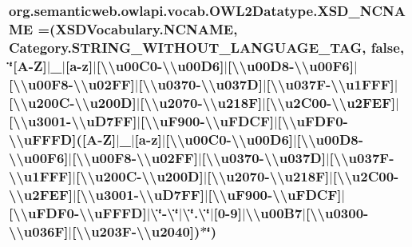 {\subsubsection[{X\-S\-D\-\_\-\-N\-C\-N\-A\-M\-E}]{\setlength{\rightskip}{0pt plus 5cm}org.\-semanticweb.\-owlapi.\-vocab.\-O\-W\-L2\-Datatype.\-X\-S\-D\-\_\-\-N\-C\-N\-A\-M\-E =({\bf X\-S\-D\-Vocabulary.\-N\-C\-N\-A\-M\-E}, {\bf Category.\-S\-T\-R\-I\-N\-G\-\_\-\-W\-I\-T\-H\-O\-U\-T\-\_\-\-L\-A\-N\-G\-U\-A\-G\-E\-\_\-\-T\-A\-G}, false, \char`\"{}\mbox{[}A-\/Z\mbox{]}$|$\-\_\-$|$\mbox{[}a-\/z\mbox{]}$|$\mbox{[}\textbackslash{}\textbackslash{}u00\-C0-\/\textbackslash{}\textbackslash{}u00\-D6\mbox{]}$|$\mbox{[}\textbackslash{}\textbackslash{}u00\-D8-\/\textbackslash{}\textbackslash{}u00\-F6\mbox{]}$|$\mbox{[}\textbackslash{}\textbackslash{}u00\-F8-\/\textbackslash{}\textbackslash{}u02\-F\-F\mbox{]}$|$\mbox{[}\textbackslash{}\textbackslash{}u0370-\/\textbackslash{}\textbackslash{}u037\-D\mbox{]}$|$\mbox{[}\textbackslash{}\textbackslash{}u037\-F-\/\textbackslash{}\textbackslash{}u1\-F\-F\-F\mbox{]}$|$\mbox{[}\textbackslash{}\textbackslash{}u200\-C-\/\textbackslash{}\textbackslash{}u200\-D\mbox{]}$|$\mbox{[}\textbackslash{}\textbackslash{}u2070-\/\textbackslash{}\textbackslash{}u218\-F\mbox{]}$|$\mbox{[}\textbackslash{}\textbackslash{}u2\-C00-\/\textbackslash{}\textbackslash{}u2\-F\-E\-F\mbox{]}$|$\mbox{[}\textbackslash{}\textbackslash{}u3001-\/\textbackslash{}\textbackslash{}u\-D7\-F\-F\mbox{]}$|$\mbox{[}\textbackslash{}\textbackslash{}u\-F900-\/\textbackslash{}\textbackslash{}u\-F\-D\-C\-F\mbox{]}$|$\mbox{[}\textbackslash{}\textbackslash{}u\-F\-D\-F0-\/\textbackslash{}\textbackslash{}u\-F\-F\-F\-D\mbox{]}(\mbox{[}A-\/Z\mbox{]}$|$\-\_\-$|$\mbox{[}a-\/z\mbox{]}$|$\mbox{[}\textbackslash{}\textbackslash{}u00\-C0-\/\textbackslash{}\textbackslash{}u00\-D6\mbox{]}$|$\mbox{[}\textbackslash{}\textbackslash{}u00\-D8-\/\textbackslash{}\textbackslash{}u00\-F6\mbox{]}$|$\mbox{[}\textbackslash{}\textbackslash{}u00\-F8-\/\textbackslash{}\textbackslash{}u02\-F\-F\mbox{]}$|$\mbox{[}\textbackslash{}\textbackslash{}u0370-\/\textbackslash{}\textbackslash{}u037\-D\mbox{]}$|$\mbox{[}\textbackslash{}\textbackslash{}u037\-F-\/\textbackslash{}\textbackslash{}u1\-F\-F\-F\mbox{]}$|$\mbox{[}\textbackslash{}\textbackslash{}u200\-C-\/\textbackslash{}\textbackslash{}u200\-D\mbox{]}$|$\mbox{[}\textbackslash{}\textbackslash{}u2070-\/\textbackslash{}\textbackslash{}u218\-F\mbox{]}$|$\mbox{[}\textbackslash{}\textbackslash{}u2\-C00-\/\textbackslash{}\textbackslash{}u2\-F\-E\-F\mbox{]}$|$\mbox{[}\textbackslash{}\textbackslash{}u3001-\/\textbackslash{}\textbackslash{}u\-D7\-F\-F\mbox{]}$|$\mbox{[}\textbackslash{}\textbackslash{}u\-F900-\/\textbackslash{}\textbackslash{}u\-F\-D\-C\-F\mbox{]}$|$\mbox{[}\textbackslash{}\textbackslash{}u\-F\-D\-F0-\/\textbackslash{}\textbackslash{}u\-F\-F\-F\-D\mbox{]}$|$\textbackslash{}\char`\"{}-\/\textbackslash{}\char`\"{}$|$\textbackslash{}\char`\"{}.\textbackslash{}\char`\"{}$|$\mbox{[}0-\/9\mbox{]}$|$\textbackslash{}\textbackslash{}u00\-B7$|$\mbox{[}\textbackslash{}\textbackslash{}u0300-\/\textbackslash{}\textbackslash{}u036\-F\mbox{]}$|$\mbox{[}\textbackslash{}\textbackslash{}u203\-F-\/\textbackslash{}\textbackslash{}u2040\mbox{]})$\ast$\char`\"{})}}\label{enumorg_1_1semanticweb_1_1owlapi_1_1vocab_1_1_o_w_l2_datatype_ae1246910d1f122474d1426cd2fb50712}

